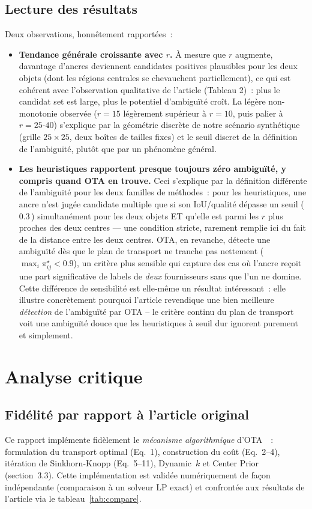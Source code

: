 \documentclass[11pt,a4paper]{article}
\begin{document}
\subsection{Lecture des résultats}
Deux observations, honnêtement rapportées~:
\begin{itemize}
  \item \textbf{Tendance générale croissante avec $r$.} À mesure que $r$ augmente, davantage d'ancres deviennent candidates positives plausibles pour les deux objets (dont les régions centrales se chevauchent partiellement), ce qui est cohérent avec l'observation qualitative de l'article (Tableau 2)~: plus le candidat set est large, plus le potentiel d'ambiguïté croît. La légère non-monotonie observée ($r=15$ légèrement supérieur à $r=10$, puis palier à $r=25$-$40$) s'explique par la géométrie discrète de notre scénario synthétique (grille $25\times25$, deux boîtes de tailles fixes) et le seuil discret de la définition de l'ambiguïté, plutôt que par un phénomène général.
  \item \textbf{Les heuristiques rapportent presque toujours zéro ambiguïté, y compris quand OTA en trouve.} Ceci s'explique par la définition différente de l'ambiguïté pour les deux familles de méthodes~: pour les heuristiques, une ancre n'est jugée \og candidate multiple\fg{} que si son IoU/qualité dépasse un seuil (\,$0.3$\,) simultanément pour les deux objets ET qu'elle est parmi les $r$ plus proches des deux centres --- une condition stricte, rarement remplie ici du fait de la distance entre les deux centres. OTA, en revanche, détecte une ambiguïté dès que le plan de transport ne \og tranche\fg{} pas nettement ($\max_i\pi^\star_{ij}<0.9$), un critère plus sensible qui capture des cas où l'ancre reçoit une part significative de labels de \emph{deux} fournisseurs sans que l'un ne domine. Cette différence de sensibilité est elle-même un résultat intéressant~: elle illustre concrètement pourquoi l'article revendique une bien meilleure \emph{détection} de l'ambiguïté par OTA -- le critère continu du plan de transport voit une ambiguïté \og douce\fg{} que les heuristiques à seuil dur ignorent purement et simplement.
\end{itemize}

\section{Analyse critique}
\label{sec:analyse}

\subsection{Fidélité par rapport à l'article original}
Ce rapport implémente fidèlement le \emph{mécanisme algorithmique} d'OTA~\cite{ge2021ota}~: formulation du transport optimal (Eq.~1), construction du coût (Eq.~2--4), itération de Sinkhorn-Knopp (Eq.~5--11), Dynamic~$k$ et Center Prior (section~3.3). Cette implémentation est validée numériquement de façon indépendante (comparaison à un solveur LP exact) et confrontée aux résultats de l'article via le tableau~\ref{tab:compare}.
\end{document}
